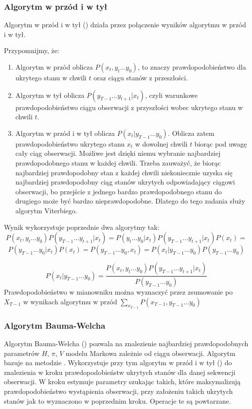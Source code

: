 \subsubsection{Algorytm w przód i w tył}
Algorytm w przód i w tył () działa przez połączenie wyników algorytmu w przód i w tył.

Przypomnijmy, że:

\begin{enumerate}
    \item Algorytm w przód oblicza $P(x_t, y_t \dots y_0)$, to znaczy prawdopodobieństwo dla ukrytego stanu w chwili $t$ oraz ciągu stanów z przeszłości.
    \item Algorytm w tył oblicza $P(y_{T-1} \dots y_{t+1} | x_t)$, czyli warunkowe prawdopodobieństwo ciągu obserwacji z przyszłości wobec ukrytego stanu w chwili $t$.
    \item Algorytm w przód i w tył oblicza $P(x_t | y_{T-1} \dots y_0)$. Oblicza zatem prawdopodobieństwo ukrytego stanu $x_t$ w dowolnej chwili $t$ biorąc pod uwagę cały ciąg obserwacji. Możliwe jest dzięki niemu wybranie najbardziej prawdopodobnego stanu w każdej chwili. Trzeba zauważyć, że biorąc najbardziej prawdopodobny stan z każdej chwili niekoniecznie uzyska się najbardziej prawdopodobny ciąg stanów ukrytych odpowiadający ciągowi obserwacji, bo przejście z jednego bardzo prawdopodobnego stanu do drugiego może być bardzo nieprawdopodobne. Dlatego do tego zadania służy algorytm Viterbiego.
\end{enumerate}

Wynik  wykorzystuje poprzednie dwa algorytmy tak:
$$P(x_t, y_t \dots y_0) P(y_{T-1} \dots y_{t+1} | x_t) = P(y_t \dots y_0 | x_t) P(y_{T-1} \dots y_{t+1} | x_t) P(x_t) = $$
$$P(y_{T-1} \dots y_0 | x_t) P(x_t) = P(y_{T-1} \dots y_0, x_t) = P(x_t | y_{T-1} \dots y_0) P(y_{T-1} \dots y_0)$$

$$P(x_t | y_{T-1} \dots y_0) = \frac{P(x_t, y_t \dots y_0) P(y_{T-1} \dots y_{t+1} | x_t)}{P(y_{T-1} \dots y_0)}$$
Prawdopodobieństwo w mianowniku można wyznaczyć przez zsumowanie po $X_{T-1}$ w wynikach algorytmu w przód $\sum_{x_{T-1}} P(x_{T-1}, y_{T-1} \dots y_0)$

\subsubsection{Algorytm Bauma-Welcha}

Algorytm Bauma-Welcha () pozwala na znalezienie najbardziej prawdopodobnych parametrów
$H$, $\pi$, $V$ modelu Markowa zależnie od ciągu obserwacji. Algorytm bazuje na metodzie
. Wykorzystuje przy tym algorytm w przód i w tył ()
do znalezienia w kroku  prawdopodobieństw ukrytych stanów dla danej sekwencji obserwacji.
W kroku  estymuje parametry szukając takich, które maksymalizują prawdopodobieństwo wystąpienia
obserwacji, przy założeniu takich ukrytych stanów jak to wyznaczono w poprzednim kroku. Operacje te są powtarzane.

